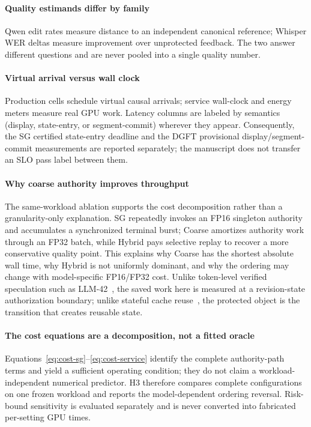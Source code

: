 \paragraph{Quality estimands differ by family}
Qwen edit rates measure distance to an independent canonical reference;
Whisper WER deltas measure improvement over unprotected feedback. The two
answer different questions and are never pooled into a single quality
number.

\paragraph{Virtual arrival versus wall clock}
Production cells schedule virtual causal arrivals; service wall-clock and
energy meters measure real GPU work. Latency columns are labeled by
semantics (display, state-entry, or segment-commit) wherever they appear.
Consequently, the SG certified state-entry deadline and the DGFT provisional
display/segment-commit measurements are reported separately; the manuscript
does not transfer an SLO pass label between them.

\paragraph{Why coarse authority improves throughput}
The same-workload ablation supports the cost decomposition rather than a
granularity-only explanation. SG repeatedly invokes an FP16 singleton
authority and accumulates a synchronized terminal burst; Coarse amortizes
authority work through an FP32 batch, while Hybrid pays selective replay to
recover a more conservative quality point. This explains why Coarse has the
shortest absolute wall time, why Hybrid is not uniformly dominant, and why the
ordering may change with model-specific FP16/FP32 cost. Unlike token-level
verified speculation such as LLM-42~\cite{zhang2026llm42}, the saved work here
is measured at a revision-state authorization boundary; unlike stateful cache
reuse~\cite{yu2025pensieve,gao2024cachedattention}, the protected object is the
transition that creates reusable state.

\paragraph{The cost equations are a decomposition, not a fitted oracle}
Equations~\eqref{eq:cost-sg}--\eqref{eq:cost-service} identify the complete
authority-path terms and yield a sufficient operating condition; they do not
claim a workload-independent numerical predictor. H3 therefore compares
complete configurations on one frozen workload and reports the model-dependent
ordering reversal. Risk-bound sensitivity is evaluated separately and is
never converted into fabricated per-setting GPU times.

